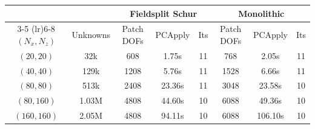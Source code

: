     \small
    \begin{tabular}{cc ccc ccc}
        \toprule
        & & \multicolumn{3}{c}{Fieldsplit Schur} & \multicolumn{3}{c}{Monolithic} \\
        \cmidrule(lr){3-5} \cmidrule(lr){6-8}
        $(N_x, N_z)$ & Unknowns & Patch DOFs & PCApply & Its
                     & Patch DOFs & PCApply & Its \\
        \midrule
        $(20, 20)$ & 32k & 608 & 1.75s & 11 & 768 & 2.05s & 11 \\
        $(40, 40)$ & 129k & 1208 & 5.76s & 11 & 1528 & 6.66s & 11 \\
        $(80, 80)$ & 513k & 2408 & 23.36s & 11 & 3048 & 23.58s & 10 \\
        $(80, 160)$ & 1.03M & 4808 & 44.60s & 10 & 6088 & 49.36s & 10 \\
        $(160, 160)$ & 2.05M & 4808 & 94.11s & 10 & 6088 & 106.10s & 10 \\
        \bottomrule
    \end{tabular}
